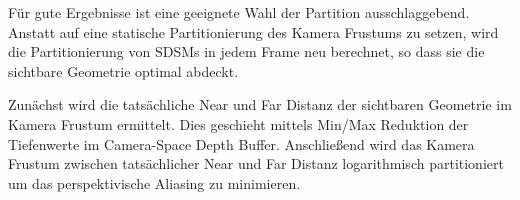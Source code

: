 \documentclass[runningheaders,a4paper]{llncs}
\begin{document}
Für gute Ergebnisse ist eine geeignete Wahl der Partition ausschlaggebend.
Anstatt auf eine statische Partitionierung des Kamera Frustums \cite{pssm} zu setzen, wird die Partitionierung von SDSMs in jedem Frame neu berechnet, so dass sie die sichtbare Geometrie optimal abdeckt.

Zunächst wird die tatsächliche Near und Far Distanz der sichtbaren Geometrie im Kamera Frustum ermittelt.
Dies geschieht mittels Min/Max Reduktion der Tiefenwerte im Camera-Space Depth Buffer.
Anschließend wird das Kamera Frustum zwischen tatsächlicher Near und Far Distanz logarithmisch partitioniert um das perspektivische Aliasing zu minimieren.


\begin{figure}[H]
	\centering
	
	

\end{figure}
\end{document}
